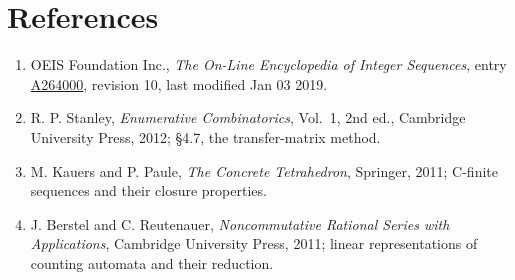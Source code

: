 \documentclass[11pt]{article}
\theoremstyle{definition}
\begin{document}
\section{References}

\begin{enumerate}

\item OEIS Foundation Inc., \emph{The On-Line Encyclopedia of Integer Sequences}, entry \href{https://oeis.org/A264000}{A264000}, revision 10, last modified Jan 03 2019.

\item R. P. Stanley, \emph{Enumerative Combinatorics}, Vol.~1, 2nd ed., Cambridge University Press, 2012; \S4.7, the transfer-matrix method.

\item M. Kauers and P. Paule, \emph{The Concrete Tetrahedron}, Springer, 2011; C-finite sequences and their closure properties.

\item J. Berstel and C. Reutenauer, \emph{Noncommutative Rational Series with Applications}, Cambridge University Press, 2011; linear representations of counting automata and their reduction.

\end{enumerate}
\end{document}
